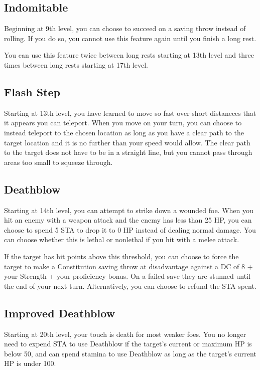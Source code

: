 \subsection{Indomitable}

Beginning at 9th level, you can choose to succeed on a saving throw instead of rolling. If you do so, you cannot use this feature again until you finish a long rest.

You can use this feature twice between long rests starting at 13th level and three times between long rests starting at 17th level.

\subsection{Flash Step}
Starting at 13th level, you have learned to move so fast over short distaneces that it appears you can teleport. When you move on your turn, you can choose to instead teleport to the chosen location as long as you have a clear path to the target location and it is no further than your speed would allow. The clear path to the target does not have to be in a straight line, but you cannot pass through areas too small to squeeze through.

\subsection{Deathblow}
Starting at 14th level, you can attempt to strike down a wounded foe. When you hit an enemy with a weapon attack and the enemy has less than 25 HP, you can choose to spend 5 STA to drop it to 0 HP instead of dealing normal damage. You can choose whether this is lethal or nonlethal if you hit with a melee attack.

If the target has hit points above this threshold, you can choose to force the target to make a Constitution saving throw at disadvantage against a DC of 8 + your Strength + your proficiency bonus. On a failed save they are stunned until the end of your next turn. Alternatively, you can choose to refund the STA spent.

\subsection{Improved Deathblow}
Starting at 20th level, your touch is death for most weaker foes. You no longer need to expend STA to use Deathblow if the target's current or maximum HP is below 50, and can spend stamina to use Deathblow as long as the target's current HP is under 100.

